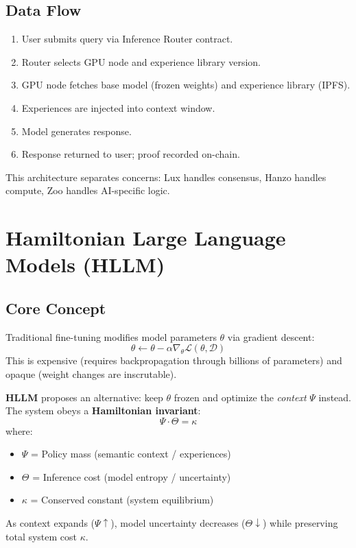 \documentclass[11pt,a4paper]{article}
\begin{document}
\subsection{Data Flow}

\begin{enumerate}
\item User submits query via Inference Router contract.
\item Router selects GPU node and experience library version.
\item GPU node fetches base model (frozen weights) and experience library (IPFS).
\item Experiences are injected into context window.
\item Model generates response.
\item Response returned to user; proof recorded on-chain.
\end{enumerate}

This architecture separates concerns: Lux handles consensus, Hanzo handles compute, Zoo handles AI-specific logic.

\section{Hamiltonian Large Language Models (HLLM)}

\subsection{Core Concept}

Traditional fine-tuning modifies model parameters $\theta$ via gradient descent:
\[
\theta \leftarrow \theta - \alpha \nabla_\theta \mathcal{L}(\theta, \mathcal{D})
\]
This is expensive (requires backpropagation through billions of parameters) and opaque (weight changes are inscrutable).

\textbf{HLLM} \cite{zoo2025hllm} proposes an alternative: keep $\theta$ frozen and optimize the \textit{context} $\Psi$ instead. The system obeys a \textbf{Hamiltonian invariant}:
\[
\Psi \cdot \Theta = \kappa
\]
where:
\begin{itemize}
\item $\Psi$ = Policy mass (semantic context / experiences)
\item $\Theta$ = Inference cost (model entropy / uncertainty)
\item $\kappa$ = Conserved constant (system equilibrium)
\end{itemize}

As context expands ($\Psi \uparrow$), model uncertainty decreases ($\Theta \downarrow$) while preserving total system cost $\kappa$.
\end{document}
